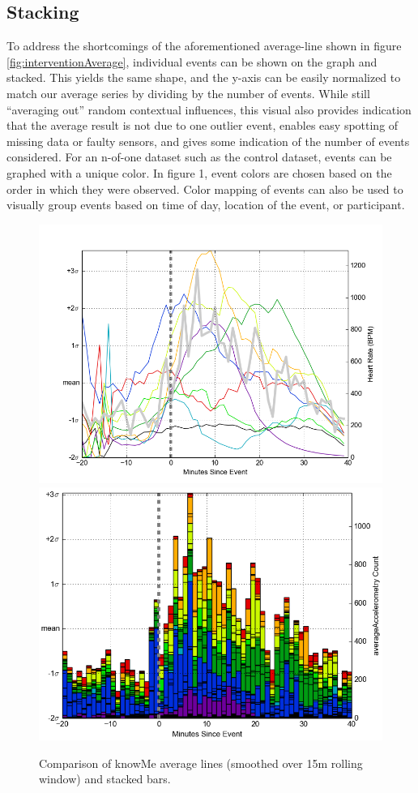 \subsection{Stacking}
To address the shortcomings of the aforementioned average-line shown in figure \ref{fig:interventionAverage}, individual events can be shown on the graph and stacked.
This yields the same shape, and the y-axis can be easily normalized to match our average series by dividing by the number of events.
While still “averaging out” random contextual influences, this visual also provides indication that the average result is not due to one outlier event, enables easy spotting of missing data or faulty sensors, and gives some indication of the number of events considered.
For an n-of-one dataset such as the control dataset, events can be graphed with a unique color.
In figure 1, event colors are chosen based on the order in which they were observed.
Color mapping of events can also be used to visually group events based on time of day, location of the event, or participant.

\begin{figure}
\centering
\includegraphics[width=0.9\columnwidth]{./img/knowMe_60m_lines_smoothed15m.png}
\includegraphics[width=0.9\columnwidth]{./img/knowMe_60m_bars.png}
\caption{Comparison of knowMe average lines (smoothed over 15m rolling window) and stacked bars.}
\label{fig:knowMeCompare}
\end{figure}


